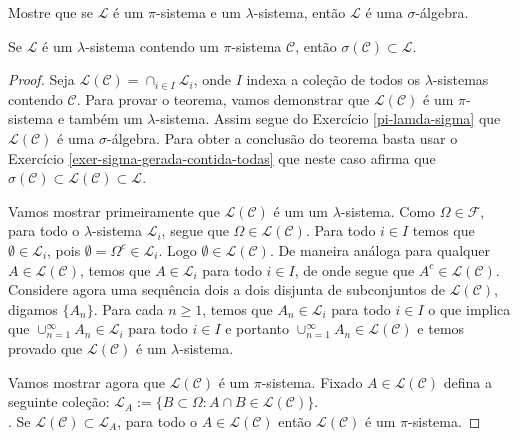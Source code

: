 \begin{exercicio}
    \label{pi-lamda-sigma}
    Mostre que se $\mathcal{L}$ é um $\pi$-sistema e um $\lambda$-sistema, então
    $\mathcal{L}$ é uma $\sigma$-álgebra.   
\end{exercicio}

\begin{teorema}
    \label{pi-lambda}
    Se $\mathcal{L}$ é um $\lambda$-sistema contendo um $\pi$-sistema 
    $\mathcal{C}$, então $ \sigma(\mathcal{C}) \subset \mathcal{L}$.
\end{teorema}

\begin{proof}
    Seja $ \mathcal{L}(\mathcal{C}) = \cap_{i\in I} \mathcal{L}_i $, 
    onde $I$ indexa a coleção de todos os $\lambda$-sistemas 
    contendo $\mathcal{C}$. 
    Para provar o teorema, vamos demonstrar que 
    $\mathcal{L}(\mathcal{C} )$ é um $\pi$-sistema e também 
    um $\lambda$-sistema.
    Assim segue do Exercício \ref{pi-lamda-sigma} que 
    $ \mathcal{L}(\mathcal{C})$ é uma $\sigma$-álgebra.  
    Para obter a conclusão do teorema basta usar 
    o Exercício \ref{exer-sigma-gerada-contida-todas} 
    que neste caso afirma que
    $\sigma(\mathcal{C}) \subset \mathcal{L}(\mathcal{C})\subset \mathcal{L}$.
    
    Vamos mostrar primeiramente que $\mathcal{L}(\mathcal{C})$ é um um  
    $\lambda$-sistema. Como $\Omega \in \mathcal{F}$, para todo o $\lambda$-sistema  
    $\mathcal{L}_i$, segue que $\Omega \in \mathcal{L}(\mathcal{C})$. 
    Para todo $i\in I$ temos que 
    $\emptyset \in \mathcal{L}_i$, pois $\emptyset = \Omega^c \in \mathcal{L}_i$. 
    Logo $\emptyset\in \mathcal{L}(\mathcal{C})$.
    De maneira análoga para qualquer $A \in \mathcal{L}(\mathcal{C})$, temos que 
    $A \in \mathcal{L}_i$ para todo $i\in I$, de onde segue que
    $A^c \in \mathcal{L}(\mathcal{C})$.
    Considere agora uma sequência dois a dois disjunta de subconjuntos de 
    $\mathcal{L}(\mathcal{C})$, digamos $\{A_n\}$. 
    Para cada $n\ge 1$, temos que $A_n \in\mathcal{L}_i$ para todo $i\in I$ 
    o que implica que $\cup_{n=1}^{\infty} A_n \in \mathcal{L}_i$ para todo $i\in I$ 
    e portanto $\cup_{n=1}^{\infty} A_n \in  \mathcal{L}(\mathcal{C})$ e temos provado
    que $\mathcal{L}(\mathcal{C})$ é um $\lambda$-sistema. 
    
    Vamos mostrar agora que $ \mathcal{L}(\mathcal{C})$ é um $\pi$-sistema. 
    Fixado
    $A \in  \mathcal{L}(\mathcal{C})$ defina a seguinte coleção:  
    $\mathcal{L}_A := \{ B \subset \Omega : A \cap B \in  \mathcal{L}(\mathcal{C})\}$. 
    \\
    . Se $ \mathcal{L}(\mathcal{C}) \subset  \mathcal{L}_A$, para todo o 
    $A \in  \mathcal{L}(\mathcal{C})$ então $\mathcal{L}(\mathcal{C})$ é um $\pi$-sistema.


\end{proof}
